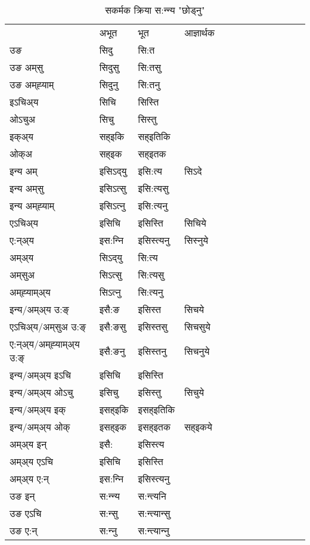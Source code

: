 \begin{table}[H]
\centering
\caption{\label{it.vt} सकर्मक क्रिया  स:न्‍न्य  "छोड्नु"  }
\begin{tabular}{l|l|l|l|l|l|l|l|l|l|l|l|l}  \toprule
&अभूत & भूत & आज्ञार्थक \\ 
उङ &सिदु &सि:त \\ 
उङ अम्‌सु &सिदुसु &सि:तसु \\ 
उङ अम्‌ह्‍याम् &सिदुनु &सि:तनु \\ 
इऽचिअ्य &सिचि &सिस्ति   \\ 
ओऽचुअ &सिचु &सिस्तु   \\ 
इक्अ्य &सह्इकि &सह्इतिकि   \\ 
ओक्अ &सह्इक &सह्इतक   \\ 
इन्य अम् & इसिऽद्‌यु  & इसि:त्य &सिऽदे  \\ 
इन्य अम्‌सु & इसिऽत्सु  & इसि:त्यसु   \\ 
इन्य अम्‌ह्‍याम् & इसिऽत्‍नु  & इसि:त्यनु   \\ 
एऽचिअ्य & इसिचि & इसिस्ति &सिचिये    \\ 
ए:न्अ्य & इस:न्‍नि  & इसिस्त्यनु &सिस्‍नुये  \\ 
अम्अ्य & सिऽद्‌यु  & सि:त्य  \\ 
अम्‌सुअ & सिऽत्सु & सि:त्यसु  \\ 
अम्‌ह्‍याम्अ्य & सिऽत्‍नु  & सि:त्यनु \\ 
\midrule
इन्य/अम्अ्य उ:ङ्‌&इसै:ङ & इसिस्त &सिचये \\ 
एऽचिअ्य/अम्‌सुअ उ:ङ्‌ &इसै:ङसु & इसिस्तसु &सिचसुये \\ 
ए:न्अ्य/अम्‌ह्‍याम्अ्य उ:ङ्‌ &इसै:ङनु & इसिस्तनु &सिचनुये \\ 
इन्य/अम्अ्य इऽचि & इसिचि & इसिस्ति    \\ 
इन्य/अम्अ्य ओऽचु & इसिचु & इसिस्तु  &सिचुये  \\ 
इन्य/अम्अ्य इक् & इसह्इकि & इसह्इतिकि   \\ 
इन्य/अम्अ्य ओक् & इसह्इक & इसह्इतक  &सह्इकये  \\ 
अम्अ्य इन् & इसै: & इसिस्त्य   \\ 
अम्अ्य एऽचि & इसिचि & इसिस्ति    \\ 
अम्अ्य ए:न् & इस:न्‍नि  & इसिस्त्यनु  \\ 
\midrule
उङ इन् & स:न्‍न्य  & स:न्त्यनि  \\ 
उङ एऽचि & स:न्सु  & स:न्त्यान्सु   \\ 
उङ ए:न्& स:न्‍नु  & स:न्त्यान्‍नु   \\ 
\bottomrule
\end{tabular}
\end{table}


